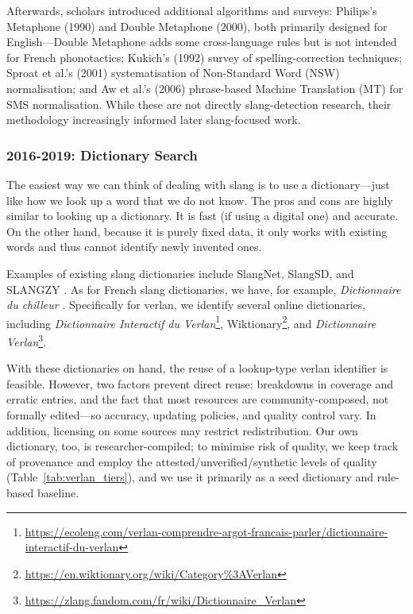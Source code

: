 \documentclass[12pt]{article}
\begin{document}
Afterwards, scholars introduced additional algorithms and surveys: Philips's Metaphone (1990) and Double Metaphone (2000), both primarily designed for English\;---\;Double Metaphone adds some cross-language rules but is not intended for French phonotactics; Kukich's (1992) survey of spelling-correction techniques; Sproat et al.'s (2001) systematisation of Non-Standard Word (NSW) normalisation; and Aw et al.'s (2006) phrase-based Machine Translation (MT) for SMS normalisation. \cite{philips1990metaphone,philips2000doublemetaphone,kukich1992techniques,sproat2001normalization,aw2006phrase} While these are not directly slang-detection research, their methodology increasingly informed later slang-focused work.



\subsubsection{2016-2019: Dictionary Search}

The easiest way we can think of dealing with slang is to use a dictionary\;---\;just like how we look up a word that we do not know. The pros and cons are highly similar to looking up a dictionary. It is fast (if using a digital one) and accurate. On the other hand, because it is purely fixed data, it only works with existing words and thus cannot identify newly invented ones.

Examples of existing slang dictionaries include SlangNet, SlangSD, and SLANGZY \cite{dhuliawala2016slangnet, wu2018slangsd, gupta2019slangzy}. As for French slang dictionaries, we have, for example, \textit{Dictionnaire du chilleur} \cite{chilleur2024}. Specifically for verlan, we identify several online dictionaries, including \textit{Dictionnaire Interactif du Verlan}\footnote{\url{https://ecoleng.com/verlan-comprendre-argot-francais-parler/dictionnaire-interactif-du-verlan}}, Wiktionary\footnote{\url{https://en.wiktionary.org/wiki/Category\%3AVerlan}}, and \textit{Dictionnaire Verlan}\footnote{\url{https://zlang.fandom.com/fr/wiki/Dictionnaire_Verlan}}.

With these dictionaries on hand, the reuse of a lookup-type verlan identifier is feasible. However, two factors prevent direct reuse: breakdowns in coverage and erratic entries, and the fact that most resources are community-composed, not formally edited\;---\;so accuracy, updating policies, and quality control vary. In addition, licensing on some sources may restrict redistribution. Our own dictionary, too, is researcher-compiled; to minimise risk of quality, we keep track of provenance and employ the attested/unverified/synthetic levels of quality (Table~\ref{tab:verlan_tiers}), and we use it primarily as a seed dictionary and rule-based baseline.
\end{document}
